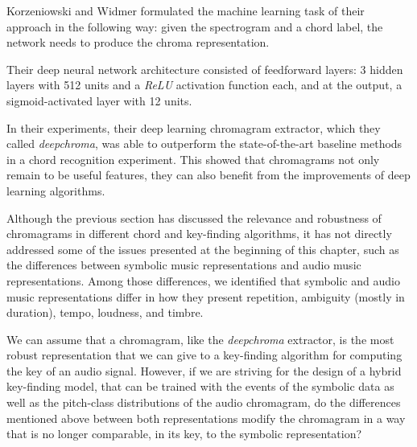 Korzeniowski and Widmer formulated the machine learning task of their approach in the following way: given the spectrogram and a chord label, the network needs to produce the chroma representation.

Their deep neural network architecture consisted of feedforward layers: 3 hidden layers with 512 units and a \emph{ReLU} activation function each, and at the output, a sigmoid-activated layer with 12 units.

In their experiments, their deep learning chromagram extractor, which they called \emph{deepchroma}, was able to outperform the state-of-the-art baseline methods in a chord recognition experiment. This showed that chromagrams not only remain to be useful features, they can also benefit from the improvements of deep learning algorithms. 


Although the previous section has discussed the relevance and robustness of chromagrams in different chord and key-finding algorithms, it has not directly addressed some of the issues presented at the beginning of this chapter, such as the differences between symbolic music representations and audio music representations. Among those differences, we identified that symbolic and audio music representations differ in how they present repetition, ambiguity (mostly in duration), tempo, loudness, and timbre.

We can assume that a chromagram, like the \emph{deepchroma} extractor, is the most robust representation that we can give to a key-finding algorithm for computing the key of an audio signal. However, if we are striving for the design of a hybrid key-finding model, that can be trained with the events of the symbolic data as well as the pitch-class distributions of the audio chromagram, do the differences mentioned above between both representations modify the chromagram in a way that is no longer comparable, in its key, to the symbolic representation?


